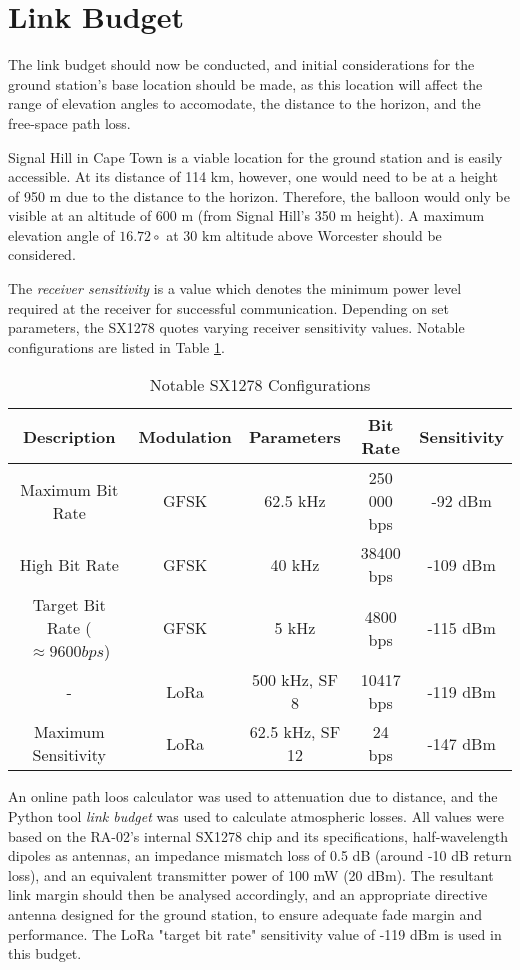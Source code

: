 \section{Link Budget}

The link budget should now be conducted, and initial considerations for the ground station's base location should be made, as this location will affect the range of elevation angles to accomodate, the distance to the horizon, and the free-space path loss.

Signal Hill in Cape Town is a viable location for the ground station and is easily accessible. At its distance of 114 km, however, one would need to be at a height of 950 m due to the distance to the horizon. Therefore, the balloon would only be visible at an altitude of 600 m (from Signal Hill's 350 m height). A maximum elevation angle of $16.72 \circ$ at 30 km altitude above Worcester should be considered.

The \textit{receiver sensitivity} is a value which denotes the minimum power level required at the receiver for successful communication. Depending on set parameters, the SX1278 quotes varying receiver sensitivity values. Notable configurations are listed in Table \ref{tab:sensitivity_values}.
\begin{table}[!htb]
  \centering
  \renewcommand{\arraystretch}{1.2}
  \begin{tabular}{ |c|c|c|c|c| }
  \hline
  \textbf{Description} & \textbf{Modulation} & \textbf{Parameters} & \textbf{Bit Rate} & \textbf{Sensitivity} \\
  \hline
  Maximum Bit Rate &
  GFSK &
  62.5 kHz &
  250 000 bps &
  -92 dBm \\
  \hline
  High Bit Rate &
  GFSK &
  40 kHz &
  38400 bps &
  -109 dBm \\
  \hline
  Target Bit Rate ($\approx 9600 bps$) &
  GFSK &
  5 kHz &
  4800 bps &
  -115 dBm \\
  \hline
  - &
  LoRa &
  500 kHz, SF 8 &
  10417 bps &
  -119 dBm \\
  \hline
  Maximum Sensitivity &
  LoRa &
  62.5 kHz, SF 12 &
  24 bps &
  -147 dBm \\
  \hline
  \end{tabular}
  \caption{Notable SX1278 Configurations}
  \label{tab:sensitivity_values}
\end{table}

An online path loos calculator was used to attenuation due to distance, and the Python tool \textit{link budget} was used to calculate atmospheric losses. All values were based on the RA-02's internal SX1278 chip and its specifications, half-wavelength dipoles as antennas, an impedance mismatch loss of 0.5 dB (around -10 dB return loss), and an equivalent transmitter power of 100 mW (20 dBm). The resultant link margin should then be analysed accordingly, and an appropriate directive antenna designed for the ground station, to ensure adequate fade margin and performance. The LoRa "target bit rate" sensitivity value of -119 dBm is used in this budget.

